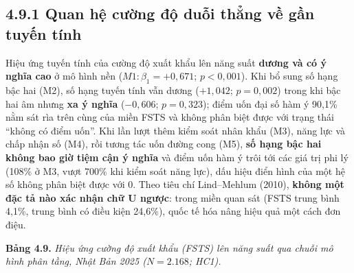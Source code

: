 \documentclass[
  a4paper,
  13pt]{extreport}
\begin{document}
\hypertarget{quan-hux1ec7-cux1b0ux1eddng-ux111ux1ed9-duux1ed7i-thux1eb3ng-vux1ec1-gux1ea7n-tuyux1ebfn-tuxednh}{%
\subsection{4.9.1 Quan hệ cường độ duỗi thẳng về gần tuyến
tính}\label{quan-hux1ec7-cux1b0ux1eddng-ux111ux1ed9-duux1ed7i-thux1eb3ng-vux1ec1-gux1ea7n-tuyux1ebfn-tuxednh}}

Hiệu ứng tuyến tính của cường độ xuất khẩu lên năng suất \textbf{dương
và có ý nghĩa cao} ở mô hình nền (\(M1: \beta_1 = +0{,}671\);
\(p < 0{,}001\)). Khi bổ sung số hạng bậc hai (M2), số hạng tuyến tính
vẫn dương (\(+1{,}042\); \(p = 0{,}002\)) trong khi bậc hai âm nhưng
\textbf{xa ý nghĩa} (\(-0{,}606\); \(p = 0{,}323\)); điểm uốn đại số hàm
ý 90,1\% nằm sát rìa trên cùng của miền FSTS và không phân biệt được với
trạng thái ``không có điểm uốn''. Khi lần lượt thêm kiểm soát nhân khẩu
(M3), năng lực và chấp nhận số (M4), rồi tương tác uốn đường cong (M5),
\textbf{số hạng bậc hai không bao giờ tiệm cận ý nghĩa} và điểm uốn hàm
ý trôi tới các giá trị phi lý (108\% ở M3, vượt 700\% khi kiểm soát năng
lực), dấu hiệu điển hình của một hệ số không phân biệt được với 0. Theo
tiêu chí Lind--Mehlum (2010), \textbf{không một đặc tả nào xác nhận chữ
U ngược}: trong miền quan sát (FSTS trung bình 4,1\%, trung bình có điều
kiện 24,6\%), quốc tế hóa nâng hiệu quả một cách đơn điệu.

\textbf{Bảng 4.9.} \emph{Hiệu ứng cường độ xuất khẩu (FSTS) lên năng
suất qua chuỗi mô hình phân tầng, Nhật Bản 2025 (\(N = 2.168\); HC1).}
\end{document}
